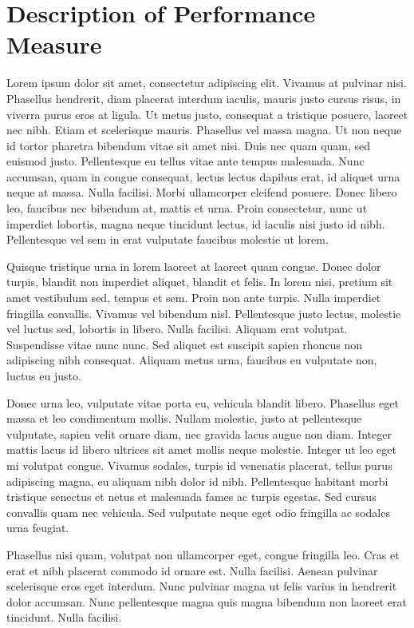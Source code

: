 \chapter{Description of Performance Measure}

Lorem ipsum dolor sit amet, consectetur adipiscing elit. Vivamus at pulvinar nisi. Phasellus hendrerit, diam placerat interdum iaculis, mauris justo cursus risus, in viverra purus eros at ligula. Ut metus justo, consequat a tristique posuere, laoreet nec nibh. Etiam et scelerisque mauris. Phasellus vel massa magna. Ut non neque id tortor pharetra bibendum vitae sit amet nisi. Duis nec quam quam, sed euismod justo. Pellentesque eu tellus vitae ante tempus malesuada. Nunc accumsan, quam in congue consequat, lectus lectus dapibus erat, id aliquet urna neque at massa. Nulla facilisi. Morbi ullamcorper eleifend posuere. Donec libero leo, faucibus nec bibendum at, mattis et urna. Proin consectetur, nunc ut imperdiet lobortis, magna neque tincidunt lectus, id iaculis nisi justo id nibh. Pellentesque vel sem in erat vulputate faucibus molestie ut lorem.

Quisque tristique urna in lorem laoreet at laoreet quam congue. Donec dolor turpis, blandit non imperdiet aliquet, blandit et felis. In lorem nisi, pretium sit amet vestibulum sed, tempus et sem. Proin non ante turpis. Nulla imperdiet fringilla convallis. Vivamus vel bibendum nisl. Pellentesque justo lectus, molestie vel luctus sed, lobortis in libero. Nulla facilisi. Aliquam erat volutpat. Suspendisse vitae nunc nunc. Sed aliquet est suscipit sapien rhoncus non adipiscing nibh consequat. Aliquam metus urna, faucibus eu vulputate non, luctus eu justo.

Donec urna leo, vulputate vitae porta eu, vehicula blandit libero. Phasellus eget massa et leo condimentum mollis. Nullam molestie, justo at pellentesque vulputate, sapien velit ornare diam, nec gravida lacus augue non diam. Integer mattis lacus id libero ultrices sit amet mollis neque molestie. Integer ut leo eget mi volutpat congue. Vivamus sodales, turpis id venenatis placerat, tellus purus adipiscing magna, eu aliquam nibh dolor id nibh. Pellentesque habitant morbi tristique senectus et netus et malesuada fames ac turpis egestas. Sed cursus convallis quam nec vehicula. Sed vulputate neque eget odio fringilla ac sodales urna feugiat.

Phasellus nisi quam, volutpat non ullamcorper eget, congue fringilla leo. Cras et erat et nibh placerat commodo id ornare est. Nulla facilisi. Aenean pulvinar scelerisque eros eget interdum. Nunc pulvinar magna ut felis varius in hendrerit dolor accumsan. Nunc pellentesque magna quis magna bibendum non laoreet erat tincidunt. Nulla facilisi.

